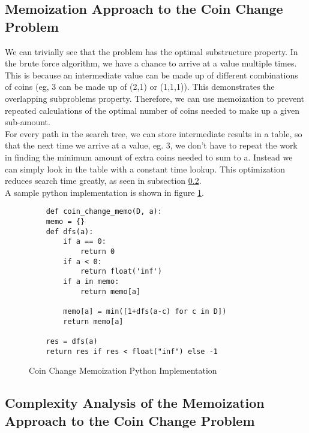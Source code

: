 \subsection{Memoization Approach to the Coin Change Problem}

We can trivially see that the problem has the optimal substructure property.
In the brute force algorithm, we have a chance to arrive at a value multiple times.
This is because an intermediate value can be made up of different combinations of coins (eg, 3 can be made up of (2,1) or (1,1,1)).
This demonstrates the overlapping subproblems property.
Therefore, we can use memoization to prevent repeated calculations of the optimal number of coins needed to make up a given sub-amount.\\
For every path in the search tree, we can store intermediate results in a table, so that the next time we arrive at a value, eg. 3, we don't have to repeat the work in finding the minimum amount of extra coins needed to sum to a.
Instead we can simply look in the table with a constant time lookup.
This optimization reduces search time greatly, as seen in subsection \ref{subsec:ca-coin-change-memo}.\\
A sample python implementation is shown in figure \ref{fig:coin-change-memo}.

\begin{figure}[H]
    \centering
    \begin{lstlisting}
    def coin_change_memo(D, a):
    memo = {}
    def dfs(a):
        if a == 0:
            return 0
        if a < 0:
            return float('inf')
        if a in memo:
            return memo[a]
        
        memo[a] = min([1+dfs(a-c) for c in D])
        return memo[a]
            
    res = dfs(a)
    return res if res < float("inf") else -1
    \end{lstlisting}
    \caption{Coin Change Memoization Python Implementation}
    \label{fig:coin-change-memo}
\end{figure}

\subsection{Complexity Analysis of the Memoization Approach to the Coin Change Problem}\label{subsec:ca-coin-change-memo}

